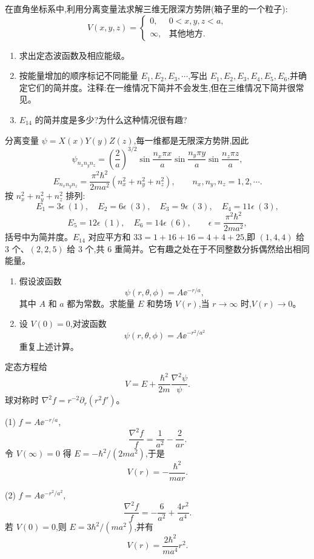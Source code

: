 \begin{question}
在直角坐标系中,利用分离变量法求解三维无限深方势阱(箱子里的一个粒子):
\[
V(x,y,z)=\begin{cases}
0, & 0<x,y,z<a,\\
\infty, & \text{其他地方}.
\end{cases}
\]
\begin{enumerate}
\item 求出定态波函数及相应能级。
\item 按能量增加的顺序标记不同能量 $E_1,E_2,E_3,\cdots$,写出 $E_1,E_2,E_3,E_4,E_5,E_6$,并确定它们的简并度。注释:在一维情况下简并不会发生,但在三维情况下简并很常见。
\item $E_{14}$ 的简并度是多少?为什么这种情况很有趣?
\end{enumerate}
\begin{solution}

分离变量 $\psi=X(x)Y(y)Z(z)$,每一维都是无限深方势阱,因此
\[
\psi_{n_xn_yn_z}=\left(\frac{2}{a}\right)^{3/2}\sin\frac{n_x\pi x}{a}\sin\frac{n_y\pi y}{a}\sin\frac{n_z\pi z}{a},
\]
\[
E_{n_xn_yn_z}=\frac{\pi^2\hbar^2}{2ma^2}(n_x^2+n_y^2+n_z^2),\qquad n_x,n_y,n_z=1,2,\cdots .
\]
按 $n_x^2+n_y^2+n_z^2$ 排列:
\[
E_1=3\epsilon\ (1),\quad E_2=6\epsilon\ (3),\quad E_3=9\epsilon\ (3),\quad E_4=11\epsilon\ (3),
\]
\[
E_5=12\epsilon\ (1),\quad E_6=14\epsilon\ (6),\qquad \epsilon=\frac{\pi^2\hbar^2}{2ma^2},
\]
括号中为简并度。$E_{14}$ 对应平方和 $33=1+16+16=4+4+25$,即 $(1,4,4)$ 给 3 个、$(2,2,5)$ 给 3 个,共 6 重简并。它有趣之处在于不同整数分拆偶然给出相同能量。

\end{solution}
\end{question}

\begin{question}
\begin{enumerate}
\item 假设波函数
\[
\psi(r,\theta,\phi)=A \ee^{-r/a},
\]
其中 $A$ 和 $a$ 都为常数。求能量 $E$ 和势场 $V(r)$,当 $r\to\infty$ 时,$V(r)\to0$。
\item 设 $V(0)=0$,对波函数
\[
\psi(r,\theta,\phi)=A \ee^{-r^2/a^2}
\]
重复上述计算。
\end{enumerate}
\begin{solution}

定态方程给
\[
V=E+\frac{\hbar^2}{2m}\frac{\nabla^2\psi}{\psi}.
\]
球对称时 $\nabla^2 f=r^{-2}\partial_r(r^2f')$。

(1) $f=A\ee^{-r/a}$,
\[
\frac{\nabla^2f}{f}=\frac{1}{a^2}-\frac{2}{ar}.
\]
令 $V(\infty)=0$ 得 $E=-\hbar^2/(2ma^2)$,于是
\[
V(r)=-\frac{\hbar^2}{mar}.
\]

(2) $f=A\ee^{-r^2/a^2}$,
\[
\frac{\nabla^2f}{f}=-\frac{6}{a^2}+\frac{4r^2}{a^4}.
\]
若 $V(0)=0$,则 $E=3\hbar^2/(ma^2)$,并有
\[
V(r)=\frac{2\hbar^2}{ma^4}r^2.
\]

\end{solution}
\end{question}

